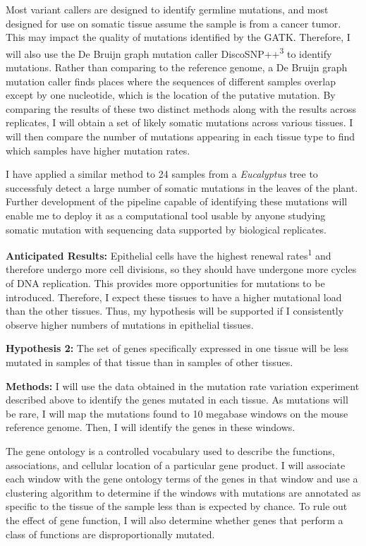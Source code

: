 \documentclass[12pt]{article}
\begin{document}
Most variant callers are designed to identify germline mutations, and most designed for use on somatic tissue assume the sample is from a cancer tumor. This may impact the quality of mutations identified by the GATK.
Therefore, I will also use the De Bruijn graph mutation caller DiscoSNP++\textsuperscript{3} to identify mutations.
Rather than comparing to the reference genome, a De Bruijn graph mutation caller finds places where the sequences of different samples overlap except by one nucleotide, which is the location of the putative mutation.
By comparing the results of these two distinct methods along with the results across replicates, I will obtain a set of likely somatic mutations across various tissues.
I will then compare the number of mutations appearing in each tissue type to find which samples have higher mutation rates.

I have applied a similar method to 24 samples from a \textit{Eucalyptus} tree to successfuly detect a large number of somatic mutations in the leaves of the plant. Further development of the pipeline capable of identifying these mutations will enable me to deploy it as a computational tool usable by anyone studying somatic mutation with sequencing data supported by biological replicates.

\textbf{Anticipated Results:}
Epithelial cells have the highest renewal rates\textsuperscript{1} and therefore undergo more cell divisions, so they should have undergone more cycles of DNA replication.
This provides more opportunities for mutations to be introduced.
Therefore, I expect these tissues to have a higher mutational load than the other tissues.
Thus, my hypothesis will be supported if I consistently observe higher numbers of mutations in epithelial tissues.

\textbf{Hypothesis 2:}
The set of genes specifically expressed in one tissue will be less mutated in samples of that tissue than in samples of other tissues.

\textbf{Methods:}
I will use the data obtained in the mutation rate variation experiment described above to identify the genes mutated in each tissue.
As mutations will be rare, I will map the mutations found to 10 megabase windows on the mouse reference genome.
Then, I will identify the genes in these windows.

The gene ontology is a controlled vocabulary used to describe the functions, associations, and cellular location of a particular gene product.
I will associate each window with the gene ontology terms of the genes in that window and use a clustering algorithm to determine if the windows with mutations are annotated as specific to the tissue of the sample less than is expected by chance.
To rule out the effect of gene function, I will also determine whether genes that perform a class of functions are disproportionally mutated.
\end{document}
